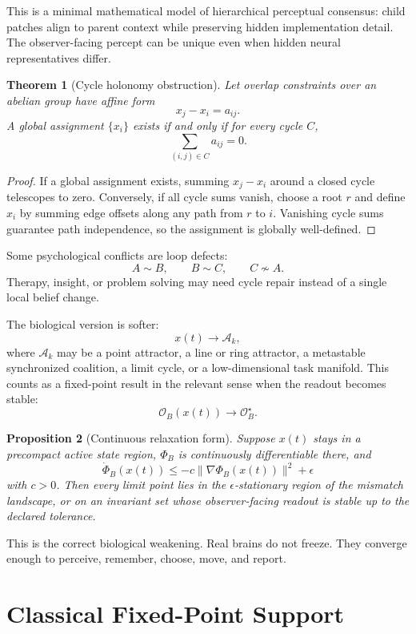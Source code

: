\documentclass[11pt]{article}
\newtheorem{theorem}{Theorem}[section]
\newtheorem{proposition}[theorem]{Proposition}
\theoremstyle{remark}
\theoremstyle{plain}
\begin{document}
This is a minimal mathematical model of hierarchical perceptual consensus: child patches align to parent context while preserving hidden implementation detail. The observer-facing percept can be unique even when hidden neural representatives differ.

\begin{theorem}[Cycle holonomy obstruction]
Let overlap constraints over an abelian group have affine form
\[
x_j-x_i=a_{ij}.
\]
A global assignment \(\{x_i\}\) exists if and only if for every cycle \(C\),
\[
\sum_{(i,j)\in C}a_{ij}=0.
\]
\end{theorem}

\begin{proof}
If a global assignment exists, summing \(x_j-x_i\) around a closed cycle telescopes to zero. Conversely, if all cycle sums vanish, choose a root \(r\) and define \(x_i\) by summing edge offsets along any path from \(r\) to \(i\). Vanishing cycle sums guarantee path independence, so the assignment is globally well-defined.
\end{proof}

Some psychological conflicts are loop defects:
\[
A\sim B,\qquad B\sim C,\qquad C\not\sim A.
\]
Therapy, insight, or problem solving may need cycle repair instead of a single local belief change.

The biological version is softer:
\[
x(t)\to \mathcal A_k,
\]
where \(\mathcal A_k\) may be a point attractor, a line or ring attractor, a metastable synchronized coalition, a limit cycle, or a low-dimensional task manifold. This counts as a fixed-point result in the relevant sense when the readout becomes stable:
\[
\mathcal O_B(x(t))\to \mathcal O_B^\star.
\]

\begin{proposition}[Continuous relaxation form]
Suppose \(x(t)\) stays in a precompact active state region, \(\Phi_B\) is continuously differentiable there, and
\[
\dot\Phi_B(x(t))
\le
-c\|\nabla\Phi_B(x(t))\|^2+\epsilon
\]
with \(c>0\). Then every limit point lies in the \(\epsilon\)-stationary region of the mismatch landscape, or on an invariant set whose observer-facing readout is stable up to the declared tolerance.
\end{proposition}

This is the correct biological weakening. Real brains do not freeze. They converge enough to perceive, remember, choose, move, and report.

\section{Classical Fixed-Point Support}
\end{document}
